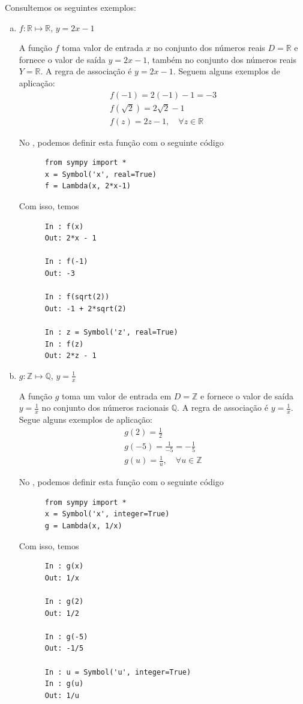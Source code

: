 \begin{ex}
  Consultemos os seguintes exemplos:
  \begin{enumerate}[a)]
  \item $f:\mathbb{R}\mapsto\mathbb{R}$, $y=2x-1$
    
    A função $f$ toma valor de entrada $x$ no conjunto dos números reais $D=\mathbb{R}$ e fornece o valor de saída $y = 2x-1$, também no conjunto dos números reais $Y=\mathbb{R}$. A regra de associação é $y=2x-1$. Seguem alguns exemplos de aplicação:
    \begin{gather}
      f(-1) = 2(-1)-1 = -3\\
      f(\sqrt{2}) = 2\sqrt{2}-1\\
      f(z) = 2z-1,\quad \forall z\in\mathbb{R}
    \end{gather}

    \ifispython
    No \python, podemos definir esta função com o seguinte código
    \begin{lstlisting}
      from sympy import *
      x = Symbol('x', real=True)
      f = Lambda(x, 2*x-1)
    \end{lstlisting}
    Com isso, temos
    \begin{lstlisting}
      In : f(x)
      Out: 2*x - 1
      
      In : f(-1)
      Out: -3
      
      In : f(sqrt(2))
      Out: -1 + 2*sqrt(2)
      
      In : z = Symbol('z', real=True)
      In : f(z)
      Out: 2*z - 1
    \end{lstlisting}
    \fi
    
  \item $g:\mathbb{Z}\mapsto\mathbb{Q}$, $\displaystyle y=\frac{1}{x}$
    
    A função $g$ toma um valor de entrada em $D=\mathbb{Z}$ e fornece o valor de saída $\displaystyle y=\frac{1}{x}$ no conjunto dos números racionais $\mathbb{Q}$. A regra de associação é $\displaystyle y = \frac{1}{x}$. Segue alguns exemplos de aplicação:
    \begin{gather}
      g(2) = \frac{1}{2}\\
      g(-5) = \frac{1}{-5} = -\frac{1}{5}\\
      g(u) = \frac{1}{u},\quad\forall u\in\mathbb{Z}
    \end{gather}

        \ifispython
    No \python, podemos definir esta função com o seguinte código
    \begin{lstlisting}
      from sympy import *
      x = Symbol('x', integer=True)
      g = Lambda(x, 1/x)
    \end{lstlisting}
    Com isso, temos
    \begin{lstlisting}
      In : g(x)
      Out: 1/x
      
      In : g(2)
      Out: 1/2
      
      In : g(-5)
      Out: -1/5
      
      In : u = Symbol('u', integer=True)
      In : g(u)
      Out: 1/u
    \end{lstlisting}
    \fi
  \end{enumerate}
\end{ex}


